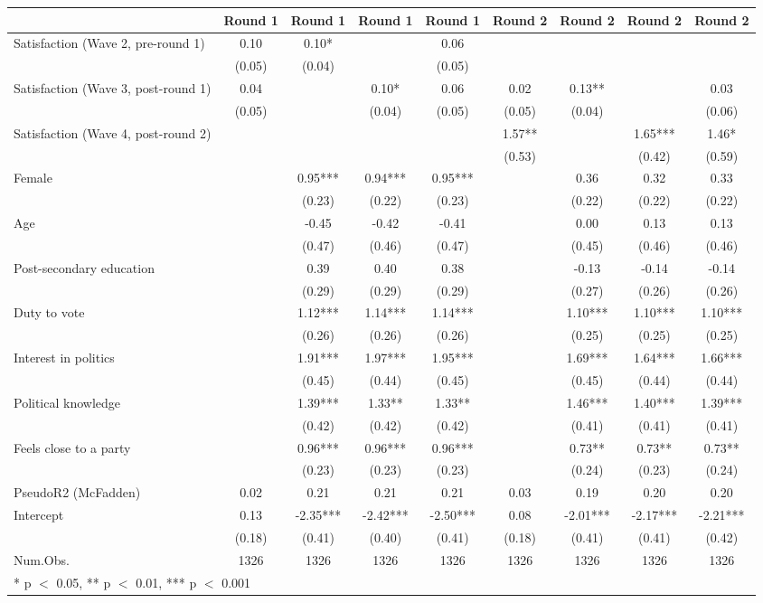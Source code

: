\begin{table}
\centering
\begin{tabular}[t]{lcccccccc}
\toprule
  & Round 1 & Round 1  & Round 1   & Round 1    & Round 2 & Round 2  & Round 2   & Round 2   \\
\midrule
Satisfaction (Wave 2, pre-round 1) & 0.10 & 0.10* &  & 0.06 &  &  &  & \\
 & (0.05) & (0.04) &  & (0.05) &  &  &  & \\
Satisfaction (Wave 3, post-round 1) & 0.04 &  & 0.10* & 0.06 & 0.02 & 0.13** &  & 0.03\\
 & (0.05) &  & (0.04) & (0.05) & (0.05) & (0.04) &  & (0.06)\\
Satisfaction (Wave 4, post-round 2) &  &  &  &  & 1.57** &  & 1.65*** & 1.46*\\
 &  &  &  &  & (0.53) &  & (0.42) & (0.59)\\
Female &  & 0.95*** & 0.94*** & 0.95*** &  & 0.36 & 0.32 & 0.33\\
 &  & (0.23) & (0.22) & (0.23) &  & (0.22) & (0.22) & (0.22)\\
Age &  & -0.45 & -0.42 & -0.41 &  & 0.00 & 0.13 & 0.13\\
 &  & (0.47) & (0.46) & (0.47) &  & (0.45) & (0.46) & (0.46)\\
Post-secondary education &  & 0.39 & 0.40 & 0.38 &  & -0.13 & -0.14 & -0.14\\
 &  & (0.29) & (0.29) & (0.29) &  & (0.27) & (0.26) & (0.26)\\
Duty to vote &  & 1.12*** & 1.14*** & 1.14*** &  & 1.10*** & 1.10*** & 1.10***\\
 &  & (0.26) & (0.26) & (0.26) &  & (0.25) & (0.25) & (0.25)\\
Interest in politics &  & 1.91*** & 1.97*** & 1.95*** &  & 1.69*** & 1.64*** & 1.66***\\
 &  & (0.45) & (0.44) & (0.45) &  & (0.45) & (0.44) & (0.44)\\
Political knowledge &  & 1.39*** & 1.33** & 1.33** &  & 1.46*** & 1.40*** & 1.39***\\
 &  & (0.42) & (0.42) & (0.42) &  & (0.41) & (0.41) & (0.41)\\
Feels close to a party &  & 0.96*** & 0.96*** & 0.96*** &  & 0.73** & 0.73** & 0.73**\\
 &  & (0.23) & (0.23) & (0.23) &  & (0.24) & (0.23) & (0.24)\\
PseudoR2 (McFadden) & 0.02 & 0.21 & 0.21 & 0.21 & 0.03 & 0.19 & 0.20 & 0.20\\
Intercept & 0.13 & -2.35*** & -2.42*** & -2.50*** & 0.08 & -2.01*** & -2.17*** & -2.21***\\
 & (0.18) & (0.41) & (0.40) & (0.41) & (0.18) & (0.41) & (0.41) & (0.42)\\
\midrule
Num.Obs. & 1326 & 1326 & 1326 & 1326 & 1326 & 1326 & 1326 & 1326\\
\bottomrule
\multicolumn{9}{l}{\rule{0pt}{1em}* p $<$ 0.05, ** p $<$ 0.01, *** p $<$ 0.001}\\
\end{tabular}
\end{table}
